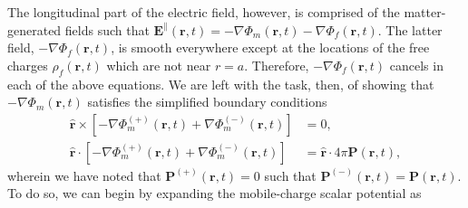 \documentclass{article}
\begin{document}
The longitudinal part of the electric field, however, is comprised of the matter-generated fields such that $\mathbf{E}^\parallel(\mathbf{r},t) = -\nabla\Phi_m(\mathbf{r},t) - \nabla\Phi_f(\mathbf{r},t)$. The latter field, $-\nabla\Phi_f(\mathbf{r},t)$, is smooth everywhere except at the locations of the free charges $\rho_f(\mathbf{r},t)$ which are not near $r = a$. Therefore, $-\nabla\Phi_f(\mathbf{r},t)$ cancels in each of the above equations. We are left with the task, then, of showing that $-\nabla\Phi_m(\mathbf{r},t)$ satisfies the simplified boundary conditions
\begin{equation}
\begin{split}
\hat{\mathbf{r}}\times\left[-\nabla\Phi_m^{(+)}(\mathbf{r},t) + \nabla\Phi_m^{(-)}(\mathbf{r},t)\right] &= 0,\\
\hat{\mathbf{r}}\cdot\left[-\nabla\Phi_m^{(+)}(\mathbf{r},t) + \nabla\Phi_m^{(-)}(\mathbf{r},t)\right] &= \hat{\mathbf{r}}\cdot4\pi\mathbf{P}(\mathbf{r},t),
\end{split}
\end{equation}
wherein we have noted that $\mathbf{P}^{(+)}(\mathbf{r},t) = 0$ such that $\mathbf{P}^{(-)}(\mathbf{r},t) = \mathbf{P}(\mathbf{r},t)$. To do so, we can begin by expanding the mobile-charge scalar potential as
\end{document}
